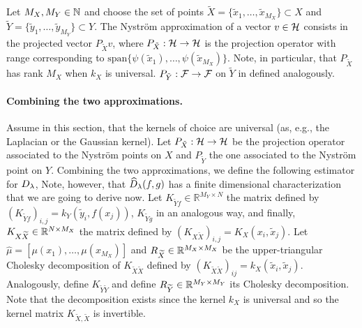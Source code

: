 Let $M_X, M_Y \in \mathbb N$ and choose the set of points $\widetilde{X} = \lbrace \widetilde x_1, \ldots, \widetilde x_{M_X}\rbrace \subset X$ and $\widetilde{Y} = \lbrace \widetilde y_1, \ldots, \widetilde y_{M_Y} \} \subset Y$. The Nystr\"om approximation of a vector $v \in \mathcal H$ consists in the projected vector $P_{\tilde{X}} v$, where $P_{\tilde{X}} :\mathcal H \to \mathcal H$ is the projection operator with range corresponding to $\textrm{span} \{\psi(\tilde{x}_1),\dots,\psi(\tilde{x}_{M_X})\}$. Note, in particular, that $P_{\tilde{X}}$ has rank $M_X$ when $k_X$ is universal. $P_{\tilde{Y}}: {\cal F} \to {\cal F}$ on $\tilde{Y}$ in defined analogously.


\paragraph{Combining the two approximations.}
Assume in this section, that the kernels of choice are universal (as, e.g., the Laplacian or the Gaussian kernel).
Let $P_{\tilde{X}}:\mathcal H \to \mathcal H$ be the projection operator associated to the Nystr\"om points on $X$ and $P_{\tilde{Y}}$ the one associated to the Nystr\"om point on $Y$. Combining the two approximations, we define the following estimator for $D_\lambda$,
Note, however, that $\widehat{D}_\lambda(f,g)$ has a finite dimensional characterization that we are going to derive now.
Let $K_{\widetilde Y f} \in \mathbb R^{M_Y \times N}$ the matrix defined by $(K_{\widetilde Y f})_{i, j} = k_Y(\widetilde y_i, f(x_j))$, $K_{\widetilde Y g}$ in an analogous way, and finally, $K_{X \widetilde X}\in\mathbb R^{N \times M_X}$ the matrix defined by $(K_{X\widetilde X})_{i, j} = K_X(x_i, \widetilde x_j)$. Let $\widehat \mu = \left[ \mu(x_1), \ldots, \mu(x_{M_X})\right]$ and $R_{\widetilde X} \in\mathbb R^{M_X \times M_X}$ be the upper-triangular Cholesky decomposition of $K_{\widetilde X \widetilde X}$ defined by $(K_{\widetilde X \widetilde X})_{ij} = k_X(\widetilde x_i, \widetilde x_j)$. Analogously, define $K_{\widetilde Y \widetilde Y}$ and define $R_{\widetilde Y}\in\mathbb R^{M_Y \times M_Y}$ its Cholesky decomposition. Note that the decomposition exists since the kernel $k_X$ is universal and so the kernel matrix $K_{\tilde{X},\tilde{X}}$ is invertible.


